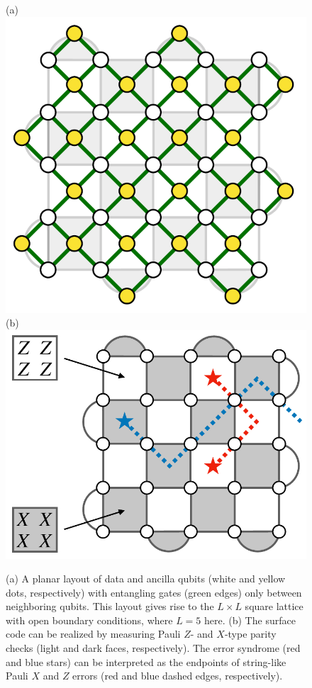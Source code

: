 \begin{refsection}
\begin{figure}[h]
\centering
(a)\includegraphics[draft=false,height=0.171\textheight]{figures/fig_surface_layout}\quad\quad\quad
(b)\includegraphics[draft=false,height=0.165\textheight]{figures/fig_surface_error_same}
\caption{
(a) A planar layout of data and ancilla qubits (white and yellow dots, respectively) with entangling gates (green edges) only between neighboring qubits.
This layout gives rise to the $L\times L$ square lattice with open boundary conditions, where $L=5$ here.
(b) The surface code can be realized by measuring Pauli $Z$- and $X$-type parity checks (light and dark faces, respectively). 
The error syndrome (red and blue stars) can be interpreted as the endpoints of string-like Pauli $X$ and $Z$ errors (red and blue dashed edges, respectively).
}
\label{fig:surface_code}
\end{figure}



\end{refsection}
